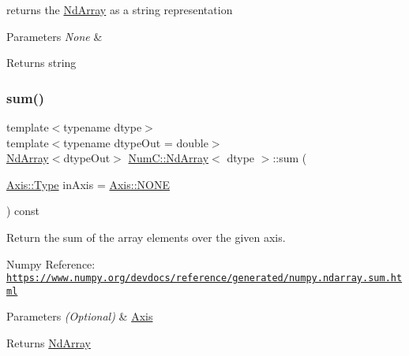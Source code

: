 returns the \mbox{\hyperlink{class_num_c_1_1_nd_array}{Nd\+Array}} as a string representation


\begin{DoxyParams}{Parameters}
{\em None} & \\
\hline
\end{DoxyParams}
\begin{DoxyReturn}{Returns}
string 
\end{DoxyReturn}
\mbox{\label{class_num_c_1_1_nd_array_a6424afd8a7039fc8f42a1e0c45e73b77}} 
\subsubsection{\texorpdfstring{sum()}{sum()}}
{\footnotesize\ttfamily template$<$typename dtype$>$ \\
template$<$typename dtype\+Out  = double$>$ \\
\mbox{\hyperlink{class_num_c_1_1_nd_array}{Nd\+Array}}$<$dtype\+Out$>$ \mbox{\hyperlink{class_num_c_1_1_nd_array}{Num\+C\+::\+Nd\+Array}}$<$ dtype $>$\+::sum (\begin{DoxyParamCaption}\item[{\mbox{\hyperlink{struct_num_c_1_1_axis_a8e689044ef1941a03482e730c5e7ebb3}{Axis\+::\+Type}}}]{in\+Axis = {\ttfamily \mbox{\hyperlink{struct_num_c_1_1_axis_a8e689044ef1941a03482e730c5e7ebb3a0ae033c4226f7184bf0050b101e7ed94}{Axis\+::\+N\+O\+NE}}} }\end{DoxyParamCaption}) const\hspace{0.3cm}{\ttfamily [inline]}}

Return the sum of the array elements over the given axis.

Numpy Reference\+: \href{https://www.numpy.org/devdocs/reference/generated/numpy.ndarray.sum.html}{\tt https\+://www.\+numpy.\+org/devdocs/reference/generated/numpy.\+ndarray.\+sum.\+html}


\begin{DoxyParams}{Parameters}
{\em (\+Optional)} & \mbox{\hyperlink{struct_num_c_1_1_axis}{Axis}} \\
\hline
\end{DoxyParams}
\begin{DoxyReturn}{Returns}
\mbox{\hyperlink{class_num_c_1_1_nd_array}{Nd\+Array}} 
\end{DoxyReturn}
\mbox{\label{class_num_c_1_1_nd_array_afe86fdb5637da58ba7630ff9051cafd2}} 
